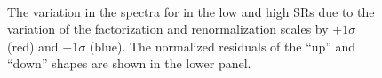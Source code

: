 \begin{figure}[h]
  \centering
   \\
  \caption{The variation in the \ptmiss spectra for \ttll in the low and high \mttll SRs due to the variation of the factorization and renormalization scales by $+1\sigma$ (red) and $-1\sigma$ (blue). The normalized residuals of the ``up'' and ``down'' shapes are shown in the lower panel.}
  \label{fig:ttQCDshape}
\end{figure}


